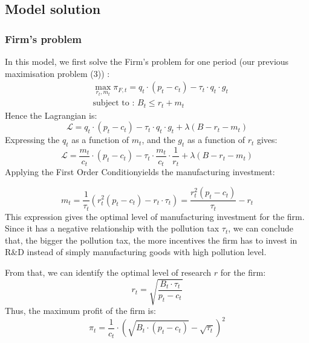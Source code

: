 \documentclass{article}
\begin{document}
\subsection{Model solution}

\subsubsection{Firm's problem}
In this model, we first solve the Firm's problem for one period (our previous maximisation problem (3)) : 
\begin{equation*}
    \begin{split}
    & \max_{r_{t},m_{t}}{\pi_{F,t}=q_{t}\cdot\left(p_{t}-c_{t}\right)-\tau_{t}\cdot q_{t}\cdot g_{t}} \\ 
    & \text{subject to : } B_{t} \leq r_{t} + m_{t}
    \end{split}
\end{equation*}
Hence the Lagrangian is: 
\begin{equation*}
    \mathcal{L} = q_{t}\cdot\left(p_{t}-c_{t}\right)-\tau_{t}\cdot q_{t}\cdot g_{t}+\lambda\left(B-r_{t}-m_{t}\right)
\end{equation*}
Expressing the $q_{t}$ as a function of $m_{t}$, and the $g_{t}$ as a function of $r_{t}$ gives: 
\begin{equation*}
    \mathcal{L} = \frac{m_{t}}{c_{t}}\cdot\left(p_{t}-c_{t}\right)-\tau_{t}\cdot \frac{m_{t}}{c_{t}}\cdot \frac{1}{r_{t}}+\lambda\left(B-r_{t}-m_{t}\right)
\end{equation*}
Applying the First Order Condition\footnotemark[3] yields the manufacturing investment:

\begin{equation}
    m_{t}=\frac{1}{\tau_{t}}\left(r_{t}^{2}(p_{t}-c_{t})-r_{t}\cdot \tau_{t}\right)=\frac{r_{t}^{2}\left(p_{t}-c_{t}\right)}{\tau_{t}}-r_{t}
\end{equation}
This expression gives the optimal level of manufacturing investment for the firm. Since it has a negative relationship with the pollution tax $\tau_{t}$, we can conclude that, the bigger the pollution tax, the more incentives the firm has to invest in R\&D instead of simply manufacturing goods with high pollution level. 

From that, we can identify the optimal level of research $r$ for the firm\footnotemark[4] :
\begin{equation}
    r_{t}=\sqrt{\frac{B_{t}\cdot \tau_{t}}{p_{t}-c_{t}}}
\end{equation}
Thus, the maximum profit of the firm is\footnotemark[5] : 
\begin{equation}
    \pi_{t}=\frac{1}{c_{t}}\cdot\left({\sqrt{B_{t}\cdot (p_{t}-c_{t})}-\sqrt{\tau_{t}}}\right)^{2}
\end{equation}
\end{document}
